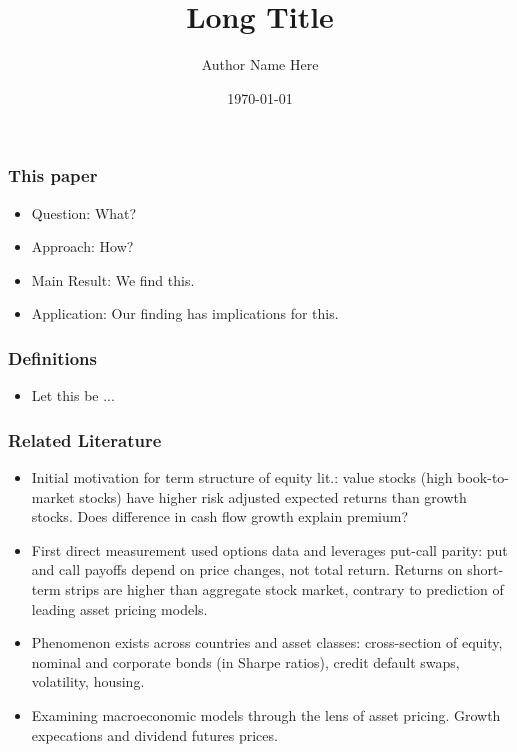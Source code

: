 \documentclass[ignorenonframetext, 9pt]{beamer}
\title[Short Title]{
Long Title
}
\author[Short Author Name]{Author Name Here}
\institute[Short Affiliation]{Long Affiliation}
\date{\today}
\begin{document}
\begin{frame}
\titlepage
\end{frame}

\begin{frame}
  \frametitle{This paper} %
  \begin{itemize}
  \item \alert{Question:} 
  What?
  \item \alert{Approach:} 
  How?
  \item \alert{Main Result:} 
  We find this.
  \item \alert{Application:}
  Our finding has implications for this.
  \end{itemize}
\end{frame}


\begin{frame}
\frametitle{Definitions}
\begin{itemize}
\item Let this be ...
\end{itemize}
\end{frame}

\begin{frame}
  \frametitle{Related Literature}
  \begin{itemize}
  \item Initial motivation for term structure of equity lit.: value stocks (high book-to-market stocks) have higher risk adjusted expected returns than growth stocks. Does difference in cash flow growth explain premium?
  \\ 
  \item First direct measurement used options data and leverages put-call parity: put and call payoffs depend on price changes, not total return. Returns on short-term strips are higher than aggregate stock market, contrary to prediction of leading asset pricing models.
  \\ 
  \item Phenomenon exists across countries and asset classes: cross-section of equity, nominal and corporate bonds (in Sharpe ratios), credit default swaps, volatility, housing.
  \\ 
  \item Examining macroeconomic models through the lens of asset pricing. Growth expecations and dividend futures prices. 
  \\ 
  \end{itemize}
\end{frame}
\end{document}
